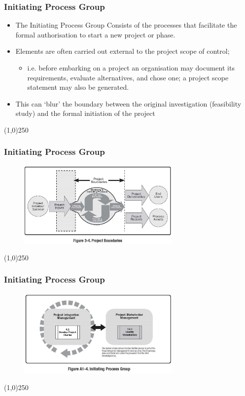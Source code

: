 \begin{frame}
\frametitle{Initiating Process Group}
\begin{itemize}
	\item The Initiating Process Group Consists of the processes that facilitate the formal authorisation to start a new project or phase.\\
	\item Elements are often carried out external to the project scope of control; \\
		\begin{itemize}
			\item i.e. before embarking on a project an organisation may document its requirements, evaluate alternatives, and chose one; a project scope statement may also be generated. 
		\end{itemize}
	\item This can `blur' the boundary between the original investigation (feasibility study) and the formal initiation of the project\\
\end{itemize}
\end{frame}
\begin{center}\line(1,0){250}\end{center}



\begin{frame}
\frametitle{Initiating Process Group}
 \begin{figure}
 	\centering
 		\includegraphics[width = 8cm]{images/Fig3-4.jpg}
 	\label{fig:3-4}
 \end{figure}
\end{frame}
\begin{center}\line(1,0){250}\end{center}



\begin{frame}
\frametitle{Initiating Process Group}
 \begin{figure}
 	\centering
 		\includegraphics[width = 8cm]{images/FigA1-4.jpg}
 	\label{fig:1-4}
 \end{figure}
\end{frame}
\begin{center}\line(1,0){250}\end{center}




